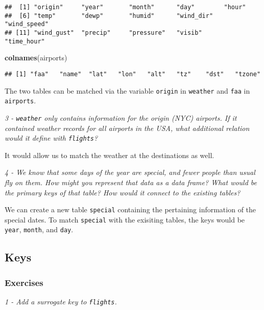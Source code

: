 \documentclass[]{article}
\newenvironment{Shaded}{\begin{snugshade}}{\end{snugshade}}
\newcommand{\KeywordTok}[1]{\textcolor[rgb]{0.13,0.29,0.53}{\textbf{#1}}}
\newcommand{\DataTypeTok}[1]{\textcolor[rgb]{0.13,0.29,0.53}{#1}}
\newcommand{\StringTok}[1]{\textcolor[rgb]{0.31,0.60,0.02}{#1}}
\newcommand{\OperatorTok}[1]{\textcolor[rgb]{0.81,0.36,0.00}{\textbf{#1}}}
\newcommand{\NormalTok}[1]{#1}
\theoremstyle{definition}
\theoremstyle{definition}
\theoremstyle{definition}
\theoremstyle{remark}
\begin{document}
\begin{verbatim}
##  [1] "origin"     "year"       "month"      "day"        "hour"      
##  [6] "temp"       "dewp"       "humid"      "wind_dir"   "wind_speed"
## [11] "wind_gust"  "precip"     "pressure"   "visib"      "time_hour"
\end{verbatim}

\begin{Shaded}
\begin{Highlighting}[]
\KeywordTok{colnames}\NormalTok{(airports)}
\end{Highlighting}
\end{Shaded}

\begin{verbatim}
## [1] "faa"   "name"  "lat"   "lon"   "alt"   "tz"    "dst"   "tzone"
\end{verbatim}

The two tables can be matched via the variable \texttt{origin} in
\texttt{weather} and \texttt{faa} in \texttt{airports}.

\emph{3 - \texttt{weather} only contains information for the origin
(NYC) airports. If it contained weather records for all airports in the
USA, what additional relation would it define with \texttt{flights}?}

It would allow us to match the weather at the destinations as well.

\emph{4 - We know that some days of the year are special, and fewer
people than usual fly on them. How might you represent that data as a
data frame? What would be the primary keys of that table? How would it
connect to the existing tables?}

We can create a new table \texttt{special} containing the pertaining
information of the special dates. To match \texttt{special} with the
exisiting tables, the keys would be \texttt{year}, \texttt{month}, and
\texttt{day}.

\subsection{Keys}\label{keys}

\subsubsection{Exercises}\label{exercises-27}

\emph{1 - Add a surrogate key to \texttt{flights}.}

\begin{Shaded}
\end{Shaded}
\end{document}
